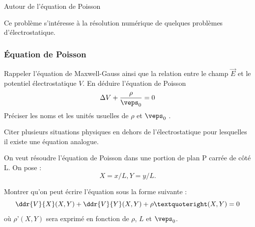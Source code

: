   \begin{exo}[PC][1][devoir]{Autour de l’équation de Poisson}
  
    Ce problème s’intéresse à la résolution numérique de quelques problèmes d’électrostatique.
  
    \subsubsection{Équation de Poisson}
  
  
  \begin{quest}
    \item  Rappeler l’équation de Maxwell-Gauss ainsi que la relation entre le champ $\Vec{E}$ et le potentiel
  électrostatique $V$. En déduire l’équation de Poisson
  \begin{equation}
    \Delta V + \frac{\rho}{\veps_0} = 0
  \end{equation}
  Préciser les noms et les unités usuelles de $\rho$ et $\veps_0$ .
  
  
  \item  Citer plusieurs situations physiques en dehors de l’électrostatique pour lesquelles il existe une
  équation analogue.
  \end{quest}
  
  On veut résoudre l’équation de Poisson dans une portion de plan P carrée de côté L. On pose :
  \begin{equation}
    X=x/L, Y=y/L.
  \end{equation}
  \begin{quest}
    \item Montrer qu’on peut écrire l’équation sous la forme suivante :
  \begin{equation}
    \ddr{V}{X}(X,Y) +\ddr{V}{Y}(X,Y) + \rho’(X,Y) =0
  \end{equation}
  où $\rho’(X, Y)$ sera exprimé en fonction de $\rho$, $L$ et $\veps_0$.
  \end{quest}
  

\end{exo}
